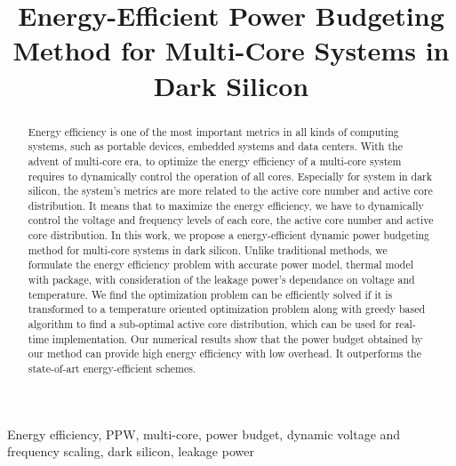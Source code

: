\documentclass[10pt,journal,compsoc]{IEEEtran}
\begin{document}
%
\title{Energy-Efficient Power Budgeting Method for Multi-Core Systems in Dark Silicon}




\maketitle

\begin{abstract}

Energy efficiency is one of the most important metrics in all kinds of computing systems, such as portable devices, embedded systems and data centers. With the advent of multi-core era, to optimize the energy efficiency of a multi-core system requires to dynamically control the operation of all cores. Especially for system in dark silicon, the system's metrics are more related to the active core number and active core distribution. It means that to maximize the energy efficiency, we have to dynamically control the voltage and frequency levels of each core, the active core number and active core distribution. In this work, we propose a energy-efficient dynamic power budgeting method for multi-core systems in dark silicon. Unlike traditional methods, we formulate the energy efficiency problem with accurate power model, thermal model with package, with consideration of the leakage power's dependance on voltage and temperature. We find the optimization problem can be efficiently solved if it is transformed to a temperature oriented optimization problem along with greedy based algorithm to find a sub-optimal active core distribution, which can be used for real-time implementation. Our numerical results show that the power budget obtained by our method can provide high energy efficiency with low overhead. It outperforms the state-of-art energy-efficient schemes.

\end{abstract}
\begin{IEEEkeywords}
Energy efficiency, PPW, multi-core, power budget, dynamic voltage and frequency scaling, dark silicon, leakage power
\end{IEEEkeywords}
\end{document}
